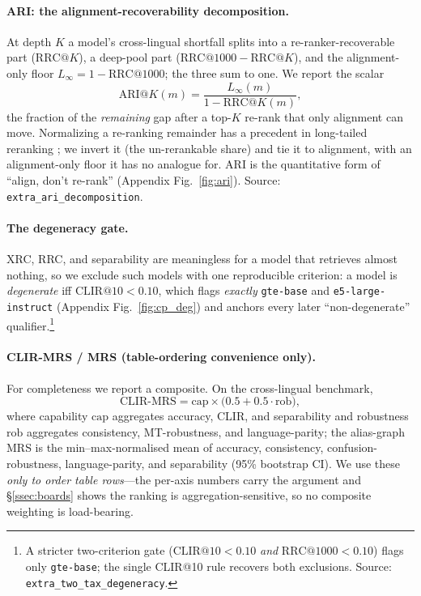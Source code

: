 \documentclass[11pt]{article}
\begin{document}
\paragraph{ARI: the alignment-recoverability decomposition.}
At depth $K$ a model's cross-lingual shortfall splits into a re-ranker-recoverable
part ($\mathrm{RRC@}K$), a deep-pool part ($\mathrm{RRC@}1000-\mathrm{RRC@}K$),
and the alignment-only floor $L_\infty=1-\mathrm{RRC@}1000$; the three sum to one.
We report the scalar
\begin{equation}
\label{eq:ari}
\mathrm{ARI@}K(m) = \frac{L_\infty(m)}{1-\mathrm{RRC@}K(m)},
\end{equation}
the fraction of the \emph{remaining} gap after a top-$K$ re-rank that only
alignment can move. Normalizing a re-ranking remainder has a precedent in
long-tailed reranking \citep{residualrerank2026}; we invert it (the un-rerankable
share) and tie it to alignment, with an alignment-only floor it has no analogue
for. ARI is the quantitative form of ``align, don't re-rank''
(Appendix Fig.~\ref{fig:ari}). Source: \texttt{extra\_ari\_decomposition}.

\paragraph{The degeneracy gate.}
XRC, RRC, and separability are meaningless for a model that retrieves almost
nothing, so we exclude such models with one reproducible criterion: a model is
\emph{degenerate} iff $\mathrm{CLIR@10} < 0.10$, which flags \emph{exactly}
\texttt{gte-base} and \texttt{e5-large-instruct} (Appendix Fig.~\ref{fig:cp_deg}) and
anchors every later ``non-degenerate'' qualifier.\footnote{A stricter
two-criterion gate ($\mathrm{CLIR@10}<0.10$ \emph{and} $\mathrm{RRC@}1000<0.10$)
flags only \texttt{gte-base}; the single CLIR@10 rule recovers both exclusions.
Source: \texttt{extra\_two\_tax\_degeneracy}.}

\paragraph{CLIR-MRS / MRS (table-ordering convenience only).}
For completeness we report a composite. On the cross-lingual benchmark,
\begin{equation}
\label{eq:clirmrs}
\mathrm{CLIR\text{-}MRS} = \mathrm{cap} \times \bigl(0.5 + 0.5\cdot\mathrm{rob}\bigr),
\end{equation}
where capability $\mathrm{cap}$ aggregates accuracy, CLIR, and separability and
robustness $\mathrm{rob}$ aggregates consistency, MT-robustness, and
language-parity; the alias-graph MRS is the min--max-normalised mean of accuracy,
consistency, confusion-robustness, language-parity, and separability (95\%
bootstrap CI). We use these \emph{only to order table rows}---the per-axis numbers
carry the argument and \S\ref{ssec:boards} shows the ranking is
aggregation-sensitive, so no composite weighting is load-bearing.
\end{document}
